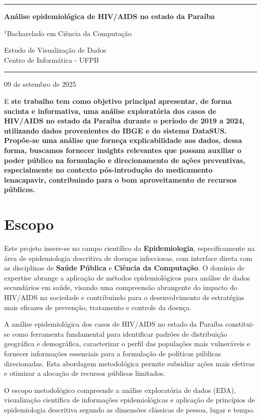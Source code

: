 \documentclass[10pt,a4paper]{article}
\newcommand{\thinline}{%
    \noindent\textcolor{cyanline}{\rule{\textwidth}{1pt}}
}
\newcommand{\makeheader}[5]{%
    \thinline
    \vspace{0.05cm}
    
    {\Huge\bfseries #1}
    \vspace{0.5cm}

    \begin{minipage}[t]{0.7\textwidth}
        {\footnotesize $^1$#2}\\[0.3cm]
    \end{minipage}
    \hfill
    \begin{minipage}[t]{0.28\textwidth}
        \raggedleft
        \footnotesize
        #3\\
        #4
    \end{minipage}
    \vspace{0.05cm}
    \thinline
    \vspace{0.2cm}
}
\newcommand{\makedate}[1]{%
    \begin{center}
        \large #1
    \end{center}
    \vspace{0.05cm}
}
\begin{document}
\makeheader{Análise epidemiológica de HIV/AIDS no estado da Paraíba}{Bacharelado em Ciência da Computação}{Estudo de Visualização de Dados}{Centro de Informática - UFPB}

\makedate{09 de setembro de 2025}

\begin{multicols}{2}

    \lettrine[lines=2]{\textcolor{cyanline}{E}}{} {\bfseries ste trabalho tem como objetivo principal apresentar, de forma sucinta e informativa, uma análise exploratória dos casos de HIV/AIDS no estado da Paraíba durante o período de 2019 a 2024, utilizando dados provenientes do IBGE e do sistema DataSUS. Propõe-se uma análise que forneça explicabilidade aos dados, dessa forma, buscamos fornecer insights relevantes que possam auxiliar o poder público na formulação e direcionamento de ações preventivas, especialmente no contexto pós-introdução do medicamento lenacapavir, contribuindo para o bom aproveitamento de recursos públicos.}

\section{Escopo}

Este projeto insere-se no campo científico da \textbf{Epidemiologia}, especificamente na área de epidemiologia descritiva de doenças infecciosas, com interface direta com as disciplinas de \textbf{Saúde Pública} e \textbf{Ciência da Computação}. O domínio de expertise abrange a aplicação de métodos epidemiológicos para análise de dados secundários em saúde, visando uma compreensão abrangente do impacto do HIV/AIDS na sociedade e contribuindo para o desenvolvimento de estratégias mais eficazes de prevenção, tratamento e controle da doença.

A análise epidemiológica dos casos de HIV/AIDS no estado da Paraíba constitui-se como ferramenta fundamental para identificar padrões de distribuição geográfica e demográfica, caracterizar o perfil das populações mais vulneráveis e fornecer informações essenciais para a formulação de políticas públicas direcionadas. Esta abordagem metodológica permite subsidiar ações mais efetivas e otimizar a alocação de recursos públicos limitados.

O escopo metodológico compreende a análise exploratória de dados (EDA), visualização científica de informações epidemiológicas e aplicação de princípios de epidemiologia descritiva segundo as dimensões clássicas de pessoa, lugar e tempo.


\end{multicols}
\end{document}
